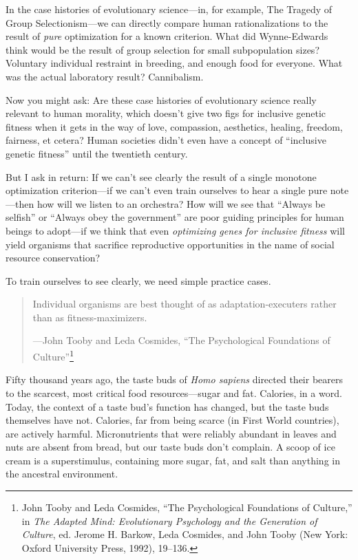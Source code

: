 {{
 In the case histories of evolutionary science---in, for example,
The Tragedy of Group Selectionism---we can directly compare human
rationalizations to the result of \textit{pure} optimization for a
known criterion. What did Wynne-Edwards think would be the result of
group selection for small subpopulation sizes? Voluntary individual
restraint in breeding, and enough food for everyone. What was the
actual laboratory result? Cannibalism.}

{
 Now you might ask: Are these case histories of evolutionary
science really relevant to human morality, which
doesn't give two figs for inclusive genetic fitness
when it gets in the way of love, compassion, aesthetics, healing,
freedom, fairness, et cetera? Human societies didn't
even have a concept of ``inclusive genetic
fitness'' until the twentieth century.}

{
 But I ask in return: If we can't see clearly the
result of a single monotone optimization criterion---if we
can't even train ourselves to hear a single pure
note---then how will we listen to an orchestra? How will we see that
``Always be selfish'' or
``Always obey the government'' are
poor guiding principles for human beings to adopt---if we think that
even \textit{optimizing genes for inclusive fitness} will yield
organisms that sacrifice reproductive opportunities in the name of
social resource conservation?}

{
 To train ourselves to see clearly, we need simple practice cases.}

\myendsectiontext


\begin{quote}
{
 Individual organisms are best thought of as adaptation-executers
rather than as fitness-maximizers.}

{\raggedleft
 {}---John Tooby and Leda Cosmides,\newline
 ``The Psychological Foundations of
Culture''\footnote{John Tooby and Leda Cosmides, ``The
Psychological Foundations of Culture,'' in
\textit{The Adapted Mind: Evolutionary Psychology and the Generation of
Culture}, ed. Jerome H. Barkow, Leda Cosmides, and John Tooby (New
York: Oxford University Press, 1992), 19--136.}
\par}
\end{quote}


{
 Fifty thousand years ago, the taste buds of \textit{Homo sapiens}
directed their bearers to the scarcest, most critical food
resources---sugar and fat. Calories, in a word. Today, the context of a
taste bud's function has changed, but the taste buds
themselves have not. Calories, far from being scarce (in First World
countries), are actively harmful. Micronutrients that were reliably
abundant in leaves and nuts are absent from bread, but our taste buds
don't complain. A scoop of ice cream is a
superstimulus, containing more sugar, fat, and salt than anything in
the ancestral environment.}

}
